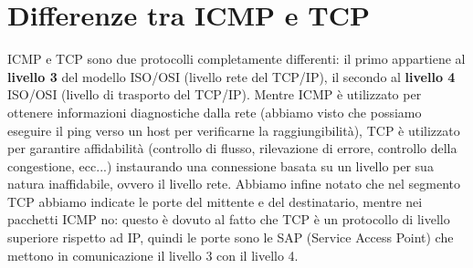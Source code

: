 \documentclass[12pt,a4paper]{report}
\begin{document}
\section{Differenze tra ICMP e TCP}
ICMP e TCP sono due protocolli completamente differenti: il primo appartiene al \textbf{livello 3} del modello ISO/OSI (livello rete del TCP/IP), il secondo al \textbf{livello 4} ISO/OSI (livello di trasporto del TCP/IP).
Mentre ICMP è utilizzato per ottenere informazioni diagnostiche dalla rete (abbiamo visto che possiamo eseguire il ping verso un host per verificarne la raggiungibilità), TCP è utilizzato per garantire affidabilità (controllo di flusso, rilevazione di errore, controllo della congestione, ecc...) instaurando una connessione basata su un livello per sua natura inaffidabile, ovvero il livello rete.
Abbiamo infine notato che nel segmento TCP abbiamo indicate le porte del mittente e del destinatario, mentre nei pacchetti ICMP no: questo è dovuto al fatto che TCP è un protocollo di livello superiore rispetto ad IP, quindi le porte sono le SAP (Service Access Point) che mettono in comunicazione il livello 3 con il livello 4.
\end{document}
